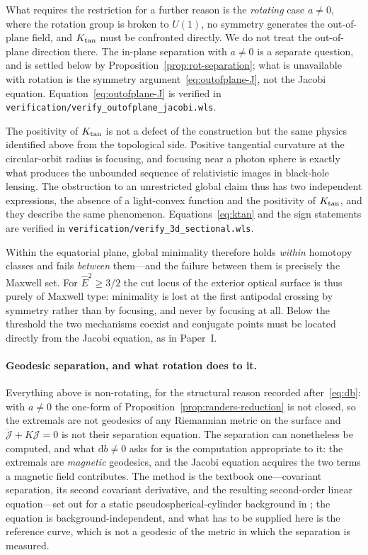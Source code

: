 \documentclass[12pt]{iopart}
\theoremstyle{plain}
\theoremstyle{definition}
\theoremstyle{remark}
\newcommand{\Ehat}{\hat E}
\newcommand{\dd}{\mathrm{d}}
\begin{document}
What requires the restriction for a further reason is the \emph{rotating} case
$a\neq0$, where the rotation group is broken to $U(1)$, no symmetry generates the
out-of-plane field, and $K_{\rm tan}$ must be confronted directly. We do not treat
the out-of-plane direction there. The in-plane separation with $a\neq0$ is a
separate question, and is settled below by
Proposition~\ref{prop:rot-separation}; what is unavailable with rotation is the
symmetry argument~\eqref{eq:outofplane-J}, not the Jacobi equation.
Equation~\eqref{eq:outofplane-J} is verified in
\texttt{verification/verify\_outofplane\_jacobi.wls}.

The positivity of $K_{\rm tan}$ is not a defect of the construction but the same
physics identified above from the topological side. Positive tangential curvature at the circular-orbit
radius is focusing, and focusing near a photon sphere is exactly what produces
the unbounded sequence of relativistic images in black-hole lensing. The
obstruction to an unrestricted global claim thus has two independent expressions,
the absence of a light-convex function and the positivity of $K_{\rm tan}$, and
they describe the same phenomenon. Equations~\eqref{eq:ktan} and the sign
statements are verified in \texttt{verification/verify\_3d\_sectional.wls}.

Within the equatorial plane, global minimality therefore holds \emph{within}
homotopy classes and fails \emph{between} them---and the failure between them is
precisely the Maxwell set.
For $\Ehat^2\ge3/2$ the cut locus of the exterior optical surface is thus purely
of Maxwell type: minimality is lost at the first antipodal crossing by symmetry
rather than by focusing, and never by focusing at all. Below the
threshold the two mechanisms coexist and conjugate points must be located
directly from the Jacobi equation, as in Paper~I.

\paragraph{Geodesic separation, and what rotation does to it.} Everything above
is non-rotating, for the structural reason recorded after~\eqref{eq:db}: with
$a\neq0$ the one-form of Proposition~\ref{prop:randers-reduction} is not closed,
so the extremals are not geodesics of any Riemannian metric on the surface and
$\ddot{\mathcal J}+K\mathcal J=0$ is not their separation equation. The
separation can nonetheless be computed, and what $\dd b\neq0$ asks for is the
computation appropriate to it: the extremals are \emph{magnetic} geodesics, and
the Jacobi equation acquires the two terms a magnetic field contributes. The
method is the textbook one---covariant separation, its second covariant
derivative, and the resulting second-order linear equation---set out for a
static pseudospherical-cylinder background in \cite[\S7]{Lecian2026Geodesics2Plane};
the equation is background-independent, and what has to be supplied here is the
reference curve, which is not a geodesic of the metric in which the separation
is measured.
\end{document}
